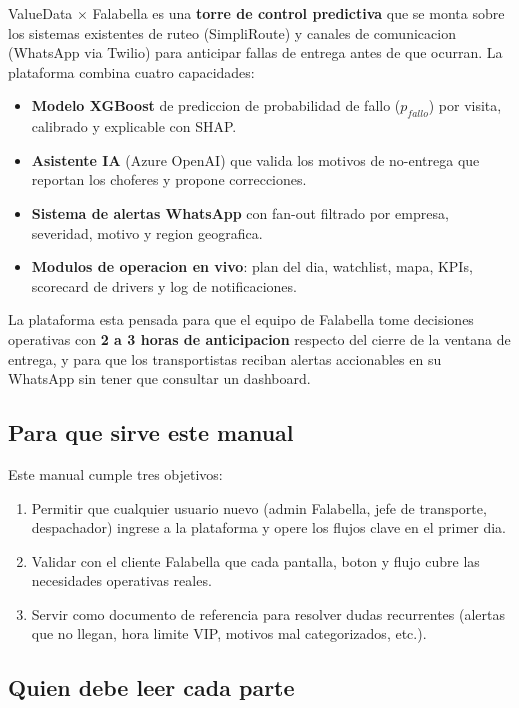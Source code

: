 \documentclass[11pt,a4paper]{article}
\begin{document}
ValueData $\times$ Falabella es una \textbf{torre de control predictiva}
que se monta sobre los sistemas existentes de ruteo (SimpliRoute) y
canales de comunicacion (WhatsApp via Twilio) para anticipar fallas de
entrega antes de que ocurran. La plataforma combina cuatro capacidades:

\begin{itemize}
  \item \textbf{Modelo XGBoost} de prediccion de probabilidad de fallo
        (\(p_{fallo}\)) por visita, calibrado y explicable con SHAP.
  \item \textbf{Asistente IA} (Azure OpenAI) que valida los motivos de
        no-entrega que reportan los choferes y propone correcciones.
  \item \textbf{Sistema de alertas WhatsApp} con fan-out filtrado por
        empresa, severidad, motivo y region geografica.
  \item \textbf{Modulos de operacion en vivo}: plan del dia, watchlist,
        mapa, KPIs, scorecard de drivers y log de notificaciones.
\end{itemize}

La plataforma esta pensada para que el equipo de Falabella tome
decisiones operativas con \textbf{2 a 3 horas de anticipacion}
respecto del cierre de la ventana de entrega, y para que los
transportistas reciban alertas accionables en su WhatsApp sin tener que
consultar un dashboard.

\subsection{Para que sirve este manual}

Este manual cumple tres objetivos:

\begin{enumerate}
  \item Permitir que cualquier usuario nuevo (admin Falabella, jefe de
        transporte, despachador) ingrese a la plataforma y opere los
        flujos clave en el primer dia.
  \item Validar con el cliente Falabella que cada pantalla, boton y
        flujo cubre las necesidades operativas reales.
  \item Servir como documento de referencia para resolver dudas
        recurrentes (alertas que no llegan, hora limite VIP, motivos
        mal categorizados, etc.).
\end{enumerate}

\subsection{Quien debe leer cada parte}
\end{document}
